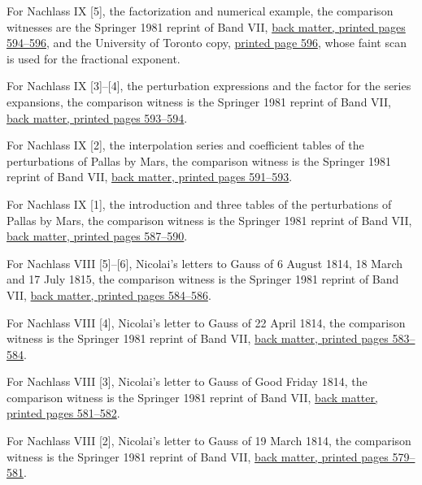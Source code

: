 For Nachlass IX [5], the factorization and numerical example, the comparison witnesses are the Springer 1981 reprint of Band VII, \href{https://link.springer.com/content/pdf/bbm:978-3-642-92478-1/1}{back matter, printed pages 594--596}, and the University of Toronto copy, \href{https://archive.org/details/werkehrsgvonderg07gausuoft}{printed page 596}, whose faint scan is used for the fractional exponent.



For Nachlass IX [3]–[4], the perturbation expressions and the factor for the series expansions, the comparison witness is the Springer 1981 reprint of Band VII, \href{https://link.springer.com/content/pdf/bbm:978-3-642-92478-1/1}{back matter, printed pages 593--594}.



For Nachlass IX [2], the interpolation series and coefficient tables of the perturbations of Pallas by Mars, the comparison witness is the Springer 1981 reprint of Band VII, \href{https://link.springer.com/content/pdf/bbm:978-3-642-92478-1/1}{back matter, printed pages 591--593}.



For Nachlass IX [1], the introduction and three tables of the perturbations of Pallas by Mars, the comparison witness is the Springer 1981 reprint of Band VII, \href{https://link.springer.com/content/pdf/bbm:978-3-642-92478-1/1}{back matter, printed pages 587--590}.



For Nachlass VIII [5]--[6], Nicolai's letters to Gauss of 6 August 1814, 18 March and 17 July 1815, the comparison witness is the Springer 1981 reprint of Band VII, \href{https://link.springer.com/content/pdf/bbm:978-3-642-92478-1/1}{back matter, printed pages 584--586}.



For Nachlass VIII [4], Nicolai's letter to Gauss of 22 April 1814, the comparison witness is the Springer 1981 reprint of Band VII, \href{https://link.springer.com/content/pdf/bbm:978-3-642-92478-1/1}{back matter, printed pages 583--584}.



For Nachlass VIII [3], Nicolai's letter to Gauss of Good Friday 1814, the comparison witness is the Springer 1981 reprint of Band VII, \href{https://link.springer.com/content/pdf/bbm:978-3-642-92478-1/1}{back matter, printed pages 581--582}.



For Nachlass VIII [2], Nicolai's letter to Gauss of 19 March 1814, the comparison witness is the Springer 1981 reprint of Band VII, \href{https://link.springer.com/content/pdf/bbm:978-3-642-92478-1/1}{back matter, printed pages 579--581}.



